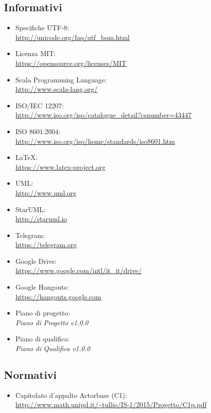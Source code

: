 \documentclass[a4paper]{report}
\begin{document}
	\subsection{Informativi}
	\begin{itemize}
		\item Specifiche UTF-8: \\ \url{http://unicode.org/faq/utf_bom.html}
		\item Licenza MIT: \\ \url{https://opensource.org/licenses/MIT}
		\item Scala Programming Language: \\ \url{http://www.scala-lang.org/}
		\item ISO/IEC 12207: \\ \url{http://www.iso.org/iso/catalogue_detail?csnumber=43447}
		\item ISO 8601:2004: \\ \url{http://www.iso.org/iso/home/standards/iso8601.htm}
		\item \LaTeX{}: \\ \url{https://www.latex-project.org}
		\item UML: \\ \url{http://www.uml.org}
		\item StarUML: \\ \url{http://staruml.io}
		\item Telegram: \\ \url{https://telegram.org}
		\item Google Drive: \\ \url{https://www.google.com/intl/it_it/drive/}
		\item Google Hangouts: \\ \url{https://hangouts.google.com}
		\item Piano di progetto: \\ \emph{Piano di Progetto v1.0.0}
		\item Piano di qualifica: \\ \emph{Piano di Qualifica v1.0.0}
	\end{itemize}
	\subsection{Normativi}
		\begin{itemize}
			\item Capitolato d'appalto Actorbase (C1): \\ 
			\url{http://www.math.unipd.it/~tullio/IS-1/2015/Progetto/C1p.pdf}
		\end{itemize}
\end{document}
